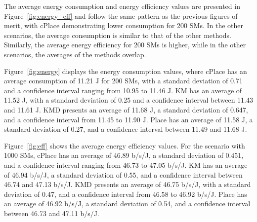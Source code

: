 \documentclass[a4paper,fleqn]{cas-dc}
\begin{document}
The average energy consumption and energy efficiency values are presented in Figure~\ref{fig:energy_eff} and follow the same pattern as the previous figures of merit, with cPlace demonstrating lower consumption for 200 \gls{SMs}. In the other scenarios, the average consumption is similar to that of the other methods. Similarly, the average energy efficiency for 200 \gls{SMs} is higher, while in the other scenarios, the averages of the methods overlap.

Figure~\ref{fig:energy} displays the energy consumption values, where cPlace has an average consumption of 11.21 J for 200 \gls{SMs}, with a standard deviation of 0.71 and a confidence interval ranging from 10.95 to 11.46 J. KM has an average of 11.52 J, with a standard deviation of 0.25 and a confidence interval between 11.43 and 11.61 J. KMD presents an average of 11.68 J, a standard deviation of 0.647, and a confidence interval from 11.45 to 11.90 J. Place has an average of 11.58 J, a standard deviation of 0.27, and a confidence interval between 11.49 and 11.68 J.

Figure~\ref{fig:eff} shows the average energy efficiency values. For the scenario with 1000 \gls{SMs}, cPlace has an average of 46.89 b/s/J, a standard deviation of 0.451, and a confidence interval ranging from 46.73 to 47.05 b/s/J. KM has an average of 46.94 b/s/J, a standard deviation of 0.55, and a confidence interval between 46.74 and 47.13 b/s/J. KMD presents an average of 46.75 b/s/J, with a standard deviation of 0.47, and a confidence interval from 46.58 to 46.92 b/s/J. Place has an average of 46.92 b/s/J, a standard deviation of 0.54, and a confidence interval between 46.73 and 47.11 b/s/J.
\end{document}
